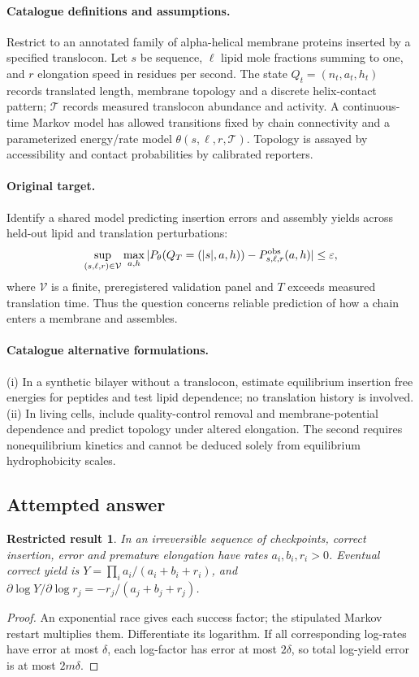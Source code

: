 \documentclass[11pt]{article}
\newtheorem{attemptresult}{Restricted result}[section]
\begin{document}
\paragraph{Catalogue definitions and assumptions.}
Restrict to an annotated family of alpha-helical membrane proteins inserted by a specified translocon. Let $s$ be sequence, $\ell$ lipid mole fractions summing to one, and $r$ elongation speed in residues per second. The state $Q_t=(n_t,a_t,h_t)$ records translated length, membrane topology and a discrete helix-contact pattern; $\mathcal T$ records measured translocon abundance and activity. A continuous-time Markov model has allowed transitions fixed by chain connectivity and a parameterized energy/rate model $\theta(s,\ell,r,\mathcal T)$. Topology is assayed by accessibility and contact probabilities by calibrated reporters.
\paragraph{Original target.}
Identify a shared model predicting insertion errors and assembly yields across held-out lipid and translation perturbations:
\[
\sup_{(s,\ell,r)\in\mathcal V}\max_{a,h}
|P_\theta(Q_T=(|s|,a,h))-P^{\rm obs}_{s,\ell,r}(a,h)|\leq\varepsilon,
\]
where $\mathcal V$ is a finite, preregistered validation panel and $T$ exceeds measured translation time. Thus the question concerns reliable prediction of how a chain enters a membrane and assembles.
\paragraph{Catalogue alternative formulations.}
(i) In a synthetic bilayer without a translocon, estimate equilibrium insertion free energies for peptides and test lipid dependence; no translation history is involved. (ii) In living cells, include quality-control removal and membrane-potential dependence and predict topology under altered elongation. The second requires nonequilibrium kinetics and cannot be deduced solely from equilibrium hydrophobicity scales.
\subsection{Attempted answer}
\begin{attemptresult}
In an irreversible sequence of checkpoints, correct insertion, error and premature elongation have rates $a_i,b_i,r_i>0$. Eventual correct yield is $Y=\prod_i a_i/(a_i+b_i+r_i)$, and $\partial\log Y/\partial\log r_j=-r_j/(a_j+b_j+r_j)$.
\end{attemptresult}
\begin{proof}
An exponential race gives each success factor; the stipulated Markov restart multiplies them. Differentiate its logarithm. If all corresponding log-rates have error at most $\delta$, each log-factor has error at most $2\delta$, so total log-yield error is at most $2m\delta$.
\end{proof}
\end{document}
